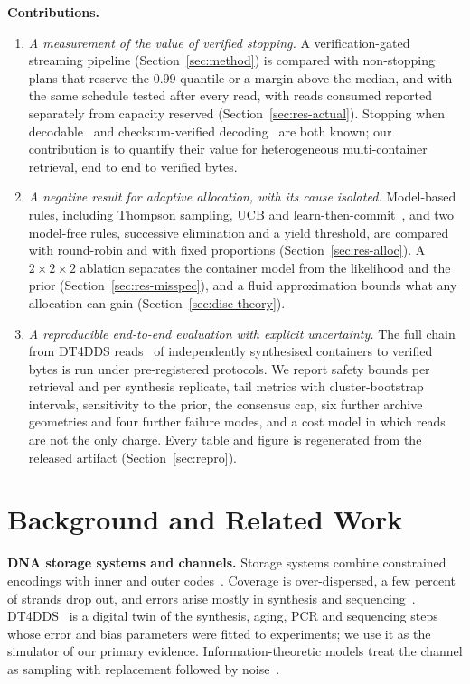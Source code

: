\documentclass[acmsmall,screen]{acmart}
\begin{document}
\textbf{Contributions.}
\begin{enumerate}
\item \emph{A measurement of the value of verified stopping.}  A verification-gated streaming pipeline
(Section~\ref{sec:method}) is compared with non-stopping plans that reserve the 0.99-quantile or a
margin above the median, and with the same schedule tested after every read, with reads consumed
reported separately from capacity reserved (Section~\ref{sec:res-actual}).  Stopping when
decodable~\cite{lopez2019dna} and checksum-verified decoding~\cite{erlich2017fountain} are both known;
our contribution is to quantify their value for heterogeneous multi-container retrieval, end to end to
verified bytes.
\item \emph{A negative result for adaptive allocation, with its cause isolated.}  Model-based rules,
including Thompson sampling, UCB and learn-then-commit~\cite{thompson1933likelihood,auer2002finite,garivier2016explore},
and two model-free rules, successive elimination and a yield threshold, are compared with round-robin and
with fixed proportions (Section~\ref{sec:res-alloc}).  A $2\times2\times2$ ablation separates the
container model from the likelihood and the prior (Section~\ref{sec:res-misspec}), and a fluid
approximation bounds what any allocation can gain (Section~\ref{sec:disc-theory}).
\item \emph{A reproducible end-to-end evaluation with explicit uncertainty.}  The full chain from
DT4DDS reads~\cite{gimpel2023digital} of independently synthesised containers to verified bytes is run
under pre-registered protocols.  We report safety bounds per retrieval and per synthesis replicate, tail
metrics with cluster-bootstrap intervals, sensitivity to the prior, the consensus cap, six further archive
geometries and four further failure modes, and a cost model in which reads are not the only charge.  Every
table and figure is regenerated from the released artifact (Section~\ref{sec:repro}).
\end{enumerate}

\section{Background and Related Work}\label{sec:related}
\textbf{DNA storage systems and channels.}  Storage systems combine constrained encodings with
inner and outer codes~\cite{antkowiak2020low,goldman2013towards,grass2015robust,erlich2017fountain,organick2018random,press2020hedges}.
Coverage is over-dispersed, a few percent of strands drop out, and errors arise mostly in
synthesis and sequencing~\cite{heckel2019characterization,chen2020quantifying,gimpel2023digital}.
DT4DDS~\cite{gimpel2023digital} is a digital twin of the synthesis, aging, PCR and sequencing
steps whose error and bias parameters were fitted to experiments; we use it as the simulator of
our primary evidence.  Information-theoretic models treat the channel as sampling with
replacement followed by noise~\cite{shomorony2021dna,weinberger2022dna,lenz2020coding}.
\end{document}
